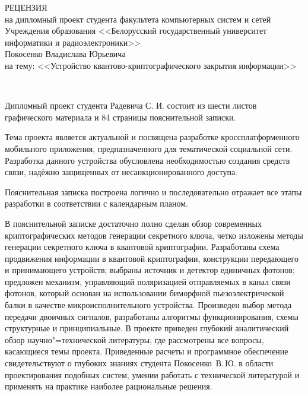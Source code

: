 
\thispagestyle{empty}

\begin{singlespace}

{\small
  \begin{center}
    \begin{minipage}{0.9\textwidth}
      \begin{center}
        {\normalsize РЕЦЕНЗИЯ}\\[0.2cm]
        на дипломный проект студента факультета компьютерных систем и сетей Учреждения образования <<Белорусский государственный университет информатики и радиоэлектроники>>\\
        Покосенко Владислава Юрьевича \\
        на тему: <<Устройство квантово-криптографического закрытия информации>>
      \end{center}
    \end{minipage}\\
  \end{center}

Дипломный проект студента Радевича С. И. состоит из шести листов графического материала и 84 страницы пояснительной записки.

Тема проекта является актуальной и посвящена разработке кроссплатформенного мобильного приложения, предназначенного для тематической социальной сети. 
Разработка данного устройства обусловлена необходимостью создания средств связи, надѐжно защищенных от несанкционированного доступа.

Пояснительная записка построена логично и последовательно отражает все этапы разработки в соответствии с календарным планом.

В пояснительной записке достаточно полно сделан обзор современных криптографических методов генерации секретного ключа, четко изложены методы генерации секретного
ключа в квантовой криптографии.
Разработаны схема продвижения информации в квантовой криптографии, конструкции передающего и принимающего устройств; выбраны источник и детектор единичных фотонов; предложен механизм, управляющий поляризацией отправляемых в канал связи фотонов, который основан на использовании биморфной пьезоэлектрической балки в качестве микроисполнительного устройства. 
Произведен выбор метода передачи двоичных сигналов, разработаны алгоритмы функционирования, схемы структурные и принципиальные.
В проекте приведен глубокий аналитический обзор научно"=технической литературы, где рассмотрены все вопросы, касающиеся темы проекта.
Приведенные расчеты и программное обеспечение свидетельствуют о глубоких знаниях студента Покосенко~В.\,Ю. в области проектирования подобных систем, умении работать с технической литературой и применять на практике наиболее рациональные решения.

}
\end{singlespace}
